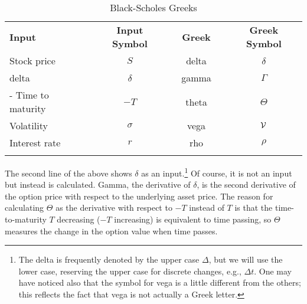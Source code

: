 \begin{table}
\centering
\caption{Black-Scholes Greeks}
\begin{tabular}{lccccc}
\hline\noalign{\smallskip}
\bfseries{Input} & \bfseries{Input Symbol} & \qquad &\bfseries{Greek} & \qquad & \bfseries{Greek Symbol}\\
\noalign{\smallskip}\hline\noalign{\smallskip}
Stock price & $S$  &\qquad& delta &\qquad& $\delta$ \\
\hline delta & $\delta$ &\qquad& gamma&\qquad & $\Gamma$\\
\hline - Time to maturity  & $-T$&\qquad& theta &\qquad& $\Theta$ \\
\hline Volatility & $\sigma$&\qquad& vega &\qquad& $\cal{V}$ \\
\hline Interest rate & $r$ &\qquad& rho&\qquad & $\rho$\\
\noalign{\smallskip}\hline
\end{tabular}
\end{table}
    
The second line of the above shows $\delta$ as an input.\footnote{The delta is frequently denoted by the upper case $\varDelta$, but we will use the lower case, reserving the upper case for discrete changes, e.g., $\varDelta t$.  One may have noticed also that the symbol for vega is a little different from the others; this reflects the fact that  vega is not actually a Greek letter.}  Of course, it is not an input but instead is calculated.  Gamma, the derivative of $\delta$, is the second derivative of the option price with respect to the underlying asset price.  The reason for calculating $\Theta$ as the derivative with respect to $-T$ instead of $T$ is that the time-to-maturity $T$ decreasing ($-T$ increasing) is equivalent to time passing, so $\Theta$ measures the change in the option value when time passes.  

